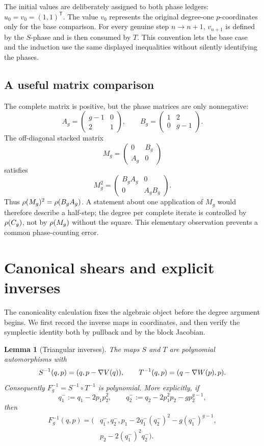 \documentclass[11pt]{article}
\newtheorem{lemma}[theorem]{Lemma}
\theoremstyle{remark}
\numberwithin{equation}{section}
\begin{document}
The initial values are deliberately assigned to both phase ledgers:
\(u_0=v_0=(1,1)^{\mathsf T}\).  The value \(v_0\) represents the original
degree-one \(p\)-coordinates only for the base comparison.  For every genuine
step \(n\to n+1\), \(v_{n+1}\) is defined by the \(S\)-phase and is then
consumed by \(T\).  This convention lets the base case and the induction use
the same displayed inequalities without silently identifying the phases.

\subsection{A useful matrix comparison}

The complete matrix is positive, but the phase matrices are only
nonnegative:
\[
 A_g=\begin{pmatrix}g-1&0\\2&1\end{pmatrix},\qquad
 B_g=\begin{pmatrix}1&2\\0&g-1\end{pmatrix}.
\]
The off-diagonal stacked matrix
\[
 M_g=\begin{pmatrix}0&B_g\\A_g&0\end{pmatrix}
\]
satisfies
\[
 M_g^2=
 \begin{pmatrix}B_gA_g&0\\0&A_gB_g\end{pmatrix}.
\]
Thus \(\rho(M_g)^2=\rho(B_gA_g)\).  A statement about one application of
\(M_g\) would therefore describe a half-step; the degree per complete iterate
is controlled by \(\rho(C_g)\), not by \(\rho(M_g)\) without the square.
This elementary observation prevents a common phase-counting error.


\section{Canonical shears and explicit inverses}\label{sec:canonical}

The canonicality calculation fixes the algebraic object before the degree
argument begins.  We first record the inverse maps in coordinates, and then
verify the symplectic identity both by pullback and by the block Jacobian.

\begin{lemma}[Triangular inverses]\label{lem:inverse}
The maps \(S\) and \(T\) are polynomial automorphisms with
\[
 S^{-1}(q,p)=(q,p-\nabla V(q)),\qquad
 T^{-1}(q,p)=(q-\nabla W(p),p).
\]
Consequently \(F_g^{-1}=S^{-1}\circ T^{-1}\) is polynomial.  More explicitly,
if
\[
 q_1^-:=q_1-2p_1p_2^2,\qquad
 q_2^-:=q_2-2p_1^2p_2-gp_2^{g-1},
\]
then
\begin{align}
 F_g^{-1}(q,p)
 =\bigl(&q_1^-,q_2^-,
 p_1-2q_1^-(q_2^-)^2-g(q_1^-)^{g-1},\nonumber\\
 &p_2-2(q_1^-)^2q_2^-\bigr).
 \label{eq:explicit-inverse}
\end{align}
\end{lemma}
\end{document}
